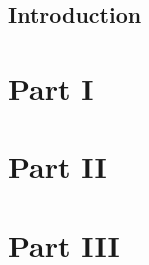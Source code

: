 
\chapter{Introduction}

    
    
    

\mainmatter
    \part{Part I}

        
        
        

    \part{Part II}

        
        
        
        

    \part{Part III}

        
        
        
